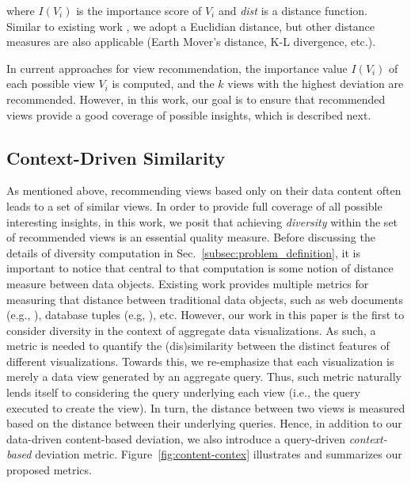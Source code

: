 \noindent where $ I\left(V_i\right) $ is the importance score of $ V_i$ and \textit{dist} is a distance function. 
%
Similar to existing work \cite{Vartak2014,Vartak2015}, we adopt a Euclidian distance, but other distance measures are also applicable (Earth Mover's distance, K-L divergence, etc.). 

In current approaches for view recommendation, the importance value $I(V_i)$ of each possible view $V_i$ is computed, and the $k$ views with the highest deviation are recommended.
%
However, in this work, our goal is to ensure that recommended views provide a good coverage of possible insights, which is described next. 
\vspace{-2pt}
\subsection{Context-Driven Similarity}
\label{context-driven-deviation}

As mentioned above, recommending views based only on their data content often leads to a set of similar views. 
%
In order to provide full coverage of all possible interesting insights, in this work, we posit that achieving {\em diversity} within the set of recommended views is an essential quality measure. 
%
%
%	
Before discussing the details of diversity computation in Sec.~\ref{subsec:problem_definition}, it is important to notice that central to that computation is some notion of distance measure between data objects.
%
Existing work provides multiple metrics for measuring that distance between traditional data objects, such as web documents (e.g., \cite{Rafiei2010,Clarke2008,Zhang2008}), database tuples (e.g, \cite{DBLP:conf/sigmod/TranC10}), etc.
%
However, our work in this paper is the first to consider diversity in the context of aggregate data visualizations. 
%
As such, a metric is needed to quantify the (dis)similarity between the distinct features of different visualizations.
%
Towards this, we re-emphasize that each visualization is merely a data view generated by an aggregate query. 
%
Thus, such metric naturally lends itself to considering the query underlying each view (i.e., the query  executed to create the view). 
%
In turn, the distance between two views is measured based on the distance between their underlying queries.  
%
Hence, in addition to our data-driven content-based deviation, we also introduce a query-driven {\em context-based} deviation metric.
%
 Figure~\ref{fig:content-contex} illustrates and summarizes our proposed metrics.
	


